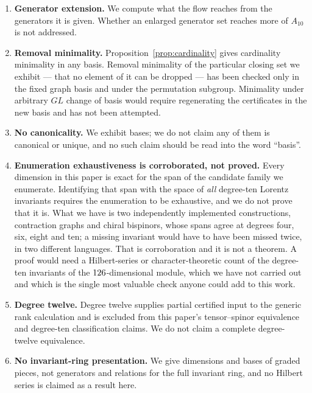 \documentclass[11pt,a4paper]{article}
\theoremstyle{definition}
\theoremstyle{remark}
\newcommand{\Ften}{A_{10}}
\begin{document}
\begin{enumerate}\itemsep3pt

\item \textbf{Generator extension.} We compute what the flow reaches from the
generators it is given. Whether an enlarged generator set reaches more of
$\Ften$ is not addressed.

\item \textbf{Removal minimality.} Proposition~\ref{prop:cardinality} gives
cardinality minimality in any basis. Removal minimality of the particular closing
set we exhibit --- that no element of it can be dropped --- has been checked only
in the fixed graph basis and under the permutation subgroup. Minimality under
arbitrary $GL$ change of basis would require regenerating the certificates in the
new basis and has not been attempted.

\item \textbf{No canonicality.} We exhibit bases; we do not claim any of them is
canonical or unique, and no such claim should be read into the word ``basis''.

\item \textbf{Enumeration exhaustiveness is corroborated, not proved.} Every
dimension in this paper is exact for the span of the candidate family we
enumerate. Identifying that span with the space of \emph{all} degree-ten
Lorentz invariants requires the enumeration to be exhaustive, and we do not
prove that it is. What we have is two independently implemented constructions,
contraction graphs and chiral bispinors, whose spans agree at degrees four, six,
eight and ten; a missing invariant would have to have been missed twice, in two
different languages. That is corroboration and it is not a theorem. A proof
would need a Hilbert-series or character-theoretic count of the degree-ten
invariants of the $126$-dimensional module, which we have not
carried out and which is the single most valuable check anyone could add to
this work.

\item \textbf{Degree twelve.} Degree twelve supplies partial certified input to
the generic rank calculation and is excluded from this paper's tensor--spinor
equivalence and degree-ten classification claims. We do not claim a complete
degree-twelve equivalence.

\item \textbf{No invariant-ring presentation.} We give dimensions and bases of
graded pieces, not generators and relations for the full invariant ring, and no
Hilbert series is claimed as a result here.


\end{enumerate}
\end{document}
